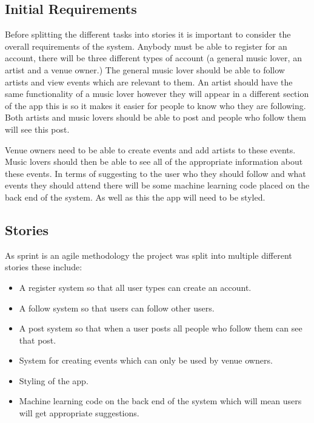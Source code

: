 \subsection{Initial Requirements}
Before splitting the different tasks into stories it is important to consider the overall requirements of the system. Anybody must be able to register for an account, there will be three different types of account (a general music lover, an artist and a venue owner.) The general music lover should be able to follow artists and view events which are relevant to them. An artist should have the same functionality of a music lover however they will appear in a different section of the app this is so it makes it easier for people to know who they are following. Both artists and music lovers should be able to post and people who follow them will see this post.

Venue owners need to be able to create events and add artists to these events. Music lovers should then be able to see all of the appropriate information about these events. In terms of suggesting to the user who they should follow and what events they should attend there will be some machine learning code placed on the back end of the system. As well as this the app will need to be styled.

\subsection{Stories}
As sprint is an agile methodology the project was split into multiple different stories these include:
\begin{itemize}
	\item A register system so that all user types can create an account.
	\item A follow system so that users can follow other users.
	\item A post system so that when a user posts all people who follow them can see that post.
	\item System for creating events which can only be used by venue owners.
	\item Styling of the app.
	\item Machine learning code on the back end of the system which will mean users will get appropriate suggestions.
\end{itemize}